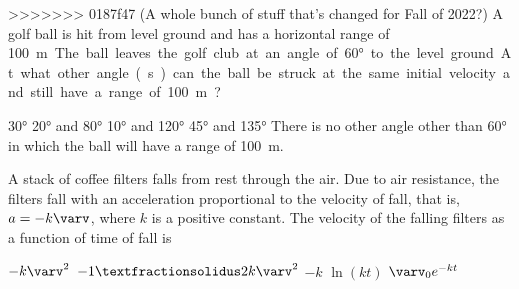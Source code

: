 \documentclass{../../oss-apphys-exam}
\begin{document}
\begin{multicols*}{2}
\begin{questions}
>>>>>>> 0187f47 (A whole bunch of stuff that's changed for Fall of 2022?)
    \question A golf ball is hit from level ground and has a horizontal range of
    \SI{100}\metre. The ball leaves the golf club at an angle of \ang{60} to
    the level ground. At what other angle(s) can the ball be struck at the same
    initial velocity and still have a range of \SI{100}\metre?
    \begin{center}
    \end{center}
    \begin{choices}
      \choice\ang{30}
      \choice\ang{20} and \ang{80}
      \choice\ang{10} and \ang{120}
      \choice\ang{45} and \ang{135}
      \choice There is no other angle other than \ang{60} in which the ball will
      have a range of \SI{100}\metre.
    \end{choices}
      
    \question A stack of coffee filters falls from rest through the air. Due to
    air resistance, the filters fall with an acceleration proportional to the
    velocity of fall, that is, $a=-k\varv$, where $k$ is a positive constant.
    The velocity of the falling filters as a function of time of fall is
    \begin{choices}
      \choice $-k\varv^2$
      \choice $-1⁄2k\varv^2$
      \choice $-k$
      \choice $\ln(kt)$
      \choice $\varv_0e^{-kt}$
    \end{choices}
    

\end{questions}
\end{multicols*}
\end{document}
